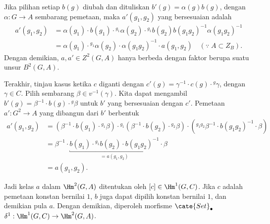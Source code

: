 Jika pilihan setiap $b(g)$ diubah dan dituliskan
$b'(g)=\alpha(g)b(g)$, dengan $\alpha:G\to A$ sembarang pemetaan, maka
$a'(g_1,g_2)$ yang bersesuaian adalah
\begin{align*}
	a'(g_1, g_2) & = \alpha(g_1) \cdot b(g_1) \cdot {}^{g_1} \alpha(g_2) \cdot {}^{g_1} b(g_2) b(g_1 g_2)^{-1} \alpha(g_1 g_2)^{-1} \\
	& = \alpha(g_1) \cdot {}^{g_1} \alpha(g_2) \cdot \alpha(g_1 g_2)^{-1} \cdot a(g_1, g_2) \quad (\because\; A \subset Z_B).
\end{align*}
Dengan demikian, $a,a'\in Z^2(G,A)$ hanya berbeda dengan faktor berupa suatu
unsur $B^2(G,A)$.

Terakhir, tinjau kasus ketika $c$ diganti dengan
$c'(g)=\gamma^{-1}\cdot c(g)\cdot{}^g\gamma$, dengan $\gamma\in C$. Pilih
sembarang $\beta\in v^{-1}(\gamma)$. Kita dapat mengambil
$b'(g)=\beta^{-1}\cdot b(g)\cdot{}^g\beta$ untuk $b'$ yang bersesuaian
dengan $c'$. Pemetaan $a':G^2\to A$ yang dibangun dari $b'$ berbentuk
\begin{align*}
	a'(g_1, g_2) & = \left( \beta^{-1} \cdot b(g_1) \cdot {}^{g_1} \beta \right) \cdot {}^{g_1} \left( \beta^{-1} \cdot b(g_2) \cdot {}^{g_2} \beta \right) \cdot \left( {}^{g_1 g_2} \beta^{-1} \cdot b(g_1 g_2)^{-1} \cdot \beta \right) \\
	& = \beta^{-1} \cdot \underbracket{b(g_1) \cdot {}^{g_1} b(g_2) \cdot b(g_1 g_2)^{-1}}_{= a(g_1, g_2)} \cdot \beta \\
	& = a(g_1, g_2).
\end{align*}

Jadi kelas $a$ dalam $\Hm^2(G,A)$ ditentukan oleh
$[c]\in\Hm^1(G,C)$. Jika $c$ adalah pemetaan konstan bernilai $1$, $b$ juga
dapat dipilih konstan bernilai $1$, dan demikian pula $a$. Dengan demikian,
diperoleh morfisme $\cate{Set}_\bullet$
$\delta^1:\Hm^1(G,C)\to\Hm^2(G,A)$.

